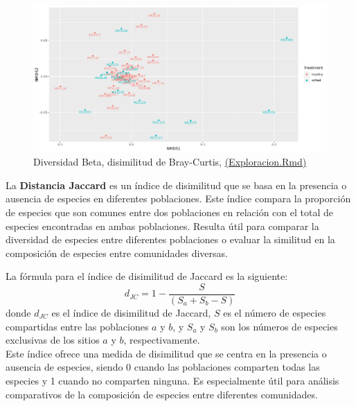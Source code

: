 \begin{figure}[h]
\centering
\includegraphics[width=\textwidth]{Img/cap2/DiversidadBetaFresaKraken_fil.png}
\caption{Diversidad Beta, disimilitud de Bray-Curtis,  \href{https://github.com/CamilaSilva1995/Tesis_Maestria/blob/main/Analisis_Comparativo/Fresa_Solena/01_Exploracion.Rmd}{(Exploracion.Rmd)}}
\end{figure}

La \textbf{Distancia Jaccard} es un índice de disimilitud que se basa en la presencia o ausencia de especies en diferentes poblaciones. Este índice compara la proporción de especies que son comunes entre dos poblaciones en relación con el total de especies encontradas en ambas poblaciones. Resulta útil para comparar la diversidad de especies entre diferentes poblaciones o evaluar la similitud en la composición de especies entre comunidades diversas.

La fórmula para el índice de disimilitud de Jaccard es la siguiente:
$$d_{JC} = 1 - \frac{S}{(S_{a} + S_{b}-S)}$$
donde $d_{JC}$ es el índice de disimilitud de Jaccard, $S$ es el número de especies compartidas entre las poblaciones $a$ y $b$, y $S_{a}$ y $S_{b}$ son los números de especies exclusivas de los sitios $a$ y $b$, respectivamente.\\

Este índice ofrece una medida de disimilitud que se centra en la presencia o ausencia de especies, siendo 0 cuando las poblaciones comparten todas las especies y 1 cuando no comparten ninguna. Es especialmente útil para análisis comparativos de la composición de especies entre diferentes comunidades.\\

